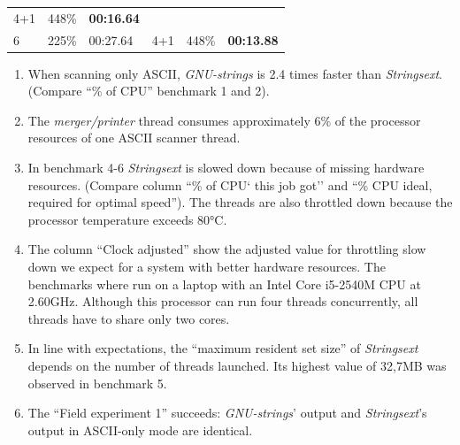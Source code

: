 \begin{longtable}[]{@{}llllll@{}}
\begin{minipage}[t]{0.14\columnwidth}
4+1\strut
\end{minipage} & \begin{minipage}[t]{0.14\columnwidth}\raggedright\strut
448\%\strut
\end{minipage} & \begin{minipage}[t]{0.14\columnwidth}\raggedright\strut
\textbf{00:16.64}\strut
\end{minipage}\tabularnewline
\begin{minipage}[t]{0.14\columnwidth}\raggedright\strut
6\strut
\end{minipage} & \begin{minipage}[t]{0.14\columnwidth}\raggedright\strut
225\%\strut
\end{minipage} & \begin{minipage}[t]{0.14\columnwidth}\raggedright\strut
00:27.64\strut
\end{minipage} & \begin{minipage}[t]{0.14\columnwidth}\raggedright\strut
4+1\strut
\end{minipage} & \begin{minipage}[t]{0.14\columnwidth}\raggedright\strut
448\%\strut
\end{minipage} & \begin{minipage}[t]{0.14\columnwidth}\raggedright\strut
\textbf{00:13.88}\strut
\end{minipage}\tabularnewline
\bottomrule
\end{longtable}

\begin{enumerate}
\def\labelenumi{\arabic{enumi}.}
\item
  When scanning only ASCII, \emph{GNU-strings} is 2.4 times faster than
  \emph{Stringsext}. (Compare ``\% of CPU'' benchmark 1 and 2).
\item
  The \emph{merger/printer} thread consumes approximately 6\% of the
  processor resources of one ASCII scanner thread.
\item
  In benchmark 4-6 \emph{Stringsext} is slowed down because of missing
  hardware resources. (Compare column ``\% of CPU` this job got'' and
  ``\% CPU ideal, required for optimal speed''). The threads are also
  throttled down because the processor temperature exceeds 80°C.
\item
  The column ``Clock adjusted'' show the adjusted value for throttling
  slow down we expect for a system with better hardware resources. The
  benchmarks where run on a laptop with an Intel Core i5-2540M CPU at
  2.60GHz. Although this processor can run four threads concurrently,
  all threads have to share only two cores.
\item
  In line with expectations, the ``maximum resident set size'' of
  \emph{Strings­ext} depends on the number of threads launched. Its
  highest value of 32,7MB was observed in benchmark 5.
\item
  The ``Field experiment 1'' succeeds: \emph{GNU-strings}' output and
  \emph{Stringsext}'s output in ASCII-only mode are identical.
\end{enumerate}

